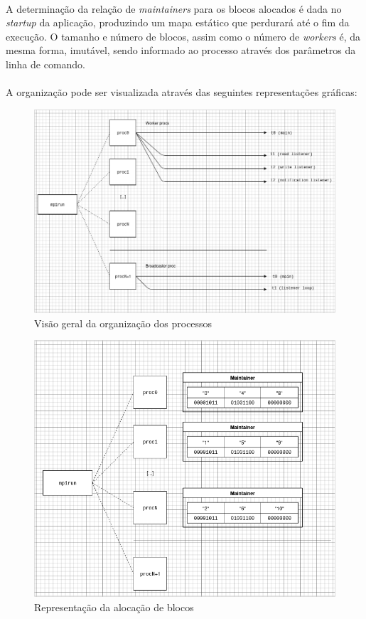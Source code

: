 \documentclass[12pt]{article}
\begin{document}
\paragraph{}
A determinação da relação de \textit{maintainers} para os blocos alocados é dada no \textit{startup} da aplicação,
produzindo um mapa estático que perdurará até o fim da execução. O tamanho e número de blocos, assim como o número de
\textit{workers} é, da mesma forma, imutável, sendo informado ao processo através dos parâmetros da linha de comando.

\paragraph{}
A organização pode ser visualizada através das seguintes representações gráficas:

\begin{figure}[h!]
\centerline{\includegraphics[totalheight=6cm]{INE5645-slide-2.drawio.png}}
  \caption{Visão geral da organização dos processos}
  \label{fig:topologia}
\end{figure}

\begin{figure}[h!]
\centerline{\includegraphics[totalheight=6cm]{INE5645-slide-3.drawio.png}}
  \caption{Representação da alocação de blocos}
  \label{fig:allocation}
\end{figure}
\end{document}
